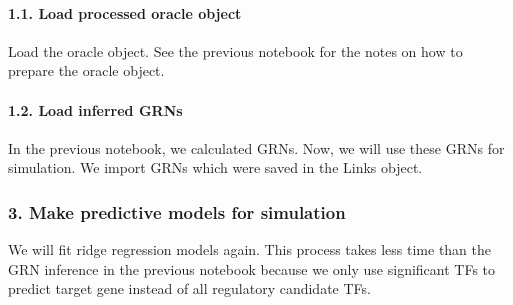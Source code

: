 \documentclass[letterpaper,10pt,english]{sphinxmanual}
\begin{document}
\paragraph{1.1. Load processed oracle object}
\label{\detokenize{notebooks/05_simulation/Gata1_KO_simulation_with_with_Paul_etal_2015_data:1.1.-Load-processed-oracle-object}}
Load the oracle object. See the previous notebook for the notes on how to prepare the oracle object.

{
\begin{sphinxVerbatim}[commandchars=\\\{\}]
\llap{\color{nbsphinxin}[7]:\,\hspace{\fboxrule}\hspace{\fboxsep}}  
\end{sphinxVerbatim}
}


\paragraph{1.2. Load inferred GRNs}
\label{\detokenize{notebooks/05_simulation/Gata1_KO_simulation_with_with_Paul_etal_2015_data:1.2.-Load-inferred-GRNs}}
In the previous notebook, we calculated GRNs. Now, we will use these GRNs for simulation. We import GRNs which were saved in the Links object.

{
\begin{sphinxVerbatim}[commandchars=\\\{\}]
\llap{\color{nbsphinxin}[8]:\,\hspace{\fboxrule}\hspace{\fboxsep}}  
\end{sphinxVerbatim}
}


\subsubsection{3. Make predictive models for simulation}
\label{\detokenize{notebooks/05_simulation/Gata1_KO_simulation_with_with_Paul_etal_2015_data:3.-Make-predictive-models-for-simulation}}
We will fit ridge regression models again. This process takes less time than the GRN inference in the previous notebook because we only use significant TFs to predict target gene instead of all regulatory candidate TFs.
\end{document}
